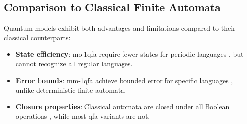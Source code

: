 \subsection*{Comparison to Classical Finite Automata}
\label{subsec:classical-comparison}
Quantum models exhibit both advantages and limitations compared to their classical counterparts:
\begin{itemize}
    \item \textbf{State efficiency}: \gls{mo-1qfa} require fewer states for periodic languages \cite{kondacs1997power}, but cannot recognize all regular languages.
    \item \textbf{Error bounds}: \gls{mm-1qfa} achieve bounded error for specific languages \cite{ambainis1998}, unlike deterministic finite automata.
    \item \textbf{Closure properties}: Classical automata are closed under all Boolean operations \cite{rabin1959}, while most \gls{qfa} variants are not.
\end{itemize}
